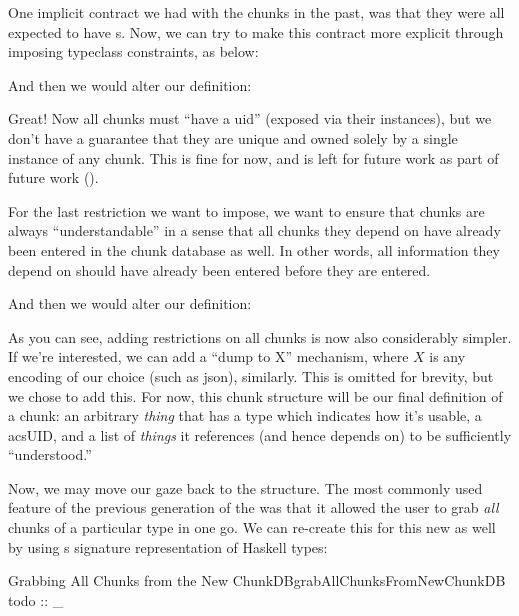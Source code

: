 One implicit contract we had with the chunks in the past, was that they were all
expected to have \UID{}s. Now, we can try to make this contract more explicit
through imposing typeclass constraints, as below:

\uidOwnershipContract{}

And then we would alter our \Chunk{} definition:

\chunksWithUidConstraint{}

Great! Now all chunks must ``have a \acs{uid}'' (exposed via their \HasUID{}
instances), but we don't have a guarantee that they are unique and owned solely
by a single instance of any chunk. This is fine for now, and is left for future
work as part of future work ().

For the last restriction we want to impose, we want to ensure that chunks are
always ``understandable'' in a sense that all chunks they depend on have already
been entered in the chunk database as well. In other words, all information they
depend on should have already been entered before they are entered.

\chunkDependenciesContract{}

And then we would alter our \Chunk{} definition:

\chunksWithUidAndRefListConstraint{}

As you can see, adding restrictions on all chunks is now also considerably
simpler. If we're interested, we can add a ``dump to X'' mechanism, where $X$ is
any encoding of our choice (such as \acs{json}), similarly. This is omitted for
brevity, but we chose to add this. For now, this chunk structure will be our
final definition of a chunk: an arbitrary \textit{thing} that has a type which
indicates how it's usable, a acs{UID}, and a list of \textit{things} it
references (and hence depends on) to be sufficiently ``understood.''

Now, we may move our gaze back to the \ChunkDB{} structure. The most commonly
used feature of the previous generation of the \ChunkDB{} was that it allowed
the user to grab \textit{all} chunks of a particular type in one go. We can
re-create this for this new \ChunkDB{} as well by using
s \TypeRep{} signature representation of Haskell types:

\begin{pseudohaskell}{Grabbing All Chunks from the New ChunkDB}{grabAllChunksFromNewChunkDB}
todo :: _
\end{pseudohaskell}

